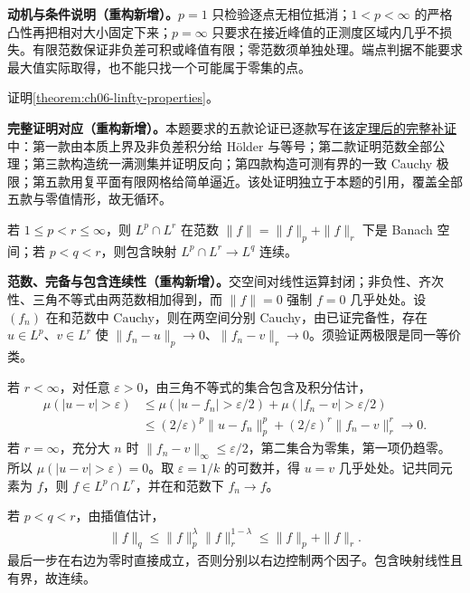 \documentclass[../../main.tex]{subfiles}
\begin{document}
\begin{remark}
\textbf{动机与条件说明（重构新增）。}$p=1$ 只检验逐点无相位抵消；$1<p<\infty$ 的严格凸性再把相对大小固定下来；$p=\infty$ 只要求在接近峰值的正测度区域内几乎不损失。有限范数保证非负差可积或峰值有限；零范数须单独处理。端点判据不能要求最大值实际取得，也不能只找一个可能属于零集的点。
\end{remark}
\begin{exercise}\label{exercise:ch06-linfty-properties}
证明\cref{theorem:ch06-linfty-properties}。
\end{exercise}
\begin{solution}
\textbf{完整证明对应（重构新增）。}本题要求的五款论证已逐款写在\hyperref[proof:ch06-linfty-properties-complete]{该定理后的完整补证}中：第一款由本质上界及非负差积分给 Hölder 与等号；第二款证明范数全部公理；第三款构造统一满测集并证明反向；第四款构造可测有界的一致 Cauchy 极限；第五款用复平面有限网格给简单逼近。该处证明独立于本题的引用，覆盖全部五款与零值情形，故无循环。
\end{solution}
\begin{exercise}\label{exercise:ch06-lp-intersection-banach}
若 $1\leqslant p<r\leqslant\infty$，则 $L^p\cap L^r$ 在范数 $\|f\|=\|f\|_p+\|f\|_r$ 下是 Banach 空间；若 $p<q<r$，则包含映射 $L^p\cap L^r\to L^q$ 连续。
\end{exercise}
\begin{solution}
\textbf{范数、完备与包含连续性（重构新增）。}交空间对线性运算封闭；非负性、齐次性、三角不等式由两范数相加得到，而 $\|f\|=0$ 强制 $f=0$ 几乎处处。设 $(f_n)$ 在和范数中 Cauchy，则在两空间分别 Cauchy，由已证完备性，存在 $u\in L^p$、$v\in L^r$ 使 $\|f_n-u\|_p\to0$、$\|f_n-v\|_r\to0$。须验证两极限是同一等价类。

若 $r<\infty$，对任意 $\varepsilon>0$，由三角不等式的集合包含及积分估计，
\begin{align*}
\mu(|u-v|>\varepsilon)
&\leqslant\mu(|u-f_n|>\varepsilon/2)+\mu(|f_n-v|>\varepsilon/2)\\
&\leqslant(2/\varepsilon)^p\|u-f_n\|_p^p
 +(2/\varepsilon)^r\|f_n-v\|_r^r\longrightarrow0.
\end{align*}
若 $r=\infty$，充分大 $n$ 时 $\|f_n-v\|_\infty\leqslant\varepsilon/2$，第二集合为零集，第一项仍趋零。所以 $\mu(|u-v|>\varepsilon)=0$。取 $\varepsilon=1/k$ 的可数并，得 $u=v$ 几乎处处。记共同元素为 $f$，则 $f\in L^p\cap L^r$，并在和范数下 $f_n\to f$。

若 $p<q<r$，由插值估计，
\begin{align*}
\|f\|_q\leqslant\|f\|_p^\lambda\|f\|_r^{1-\lambda}
\leqslant\|f\|_p+\|f\|_r.
\end{align*}
最后一步在右边为零时直接成立，否则分别以右边控制两个因子。包含映射线性且有界，故连续。
\end{solution}
\end{document}
